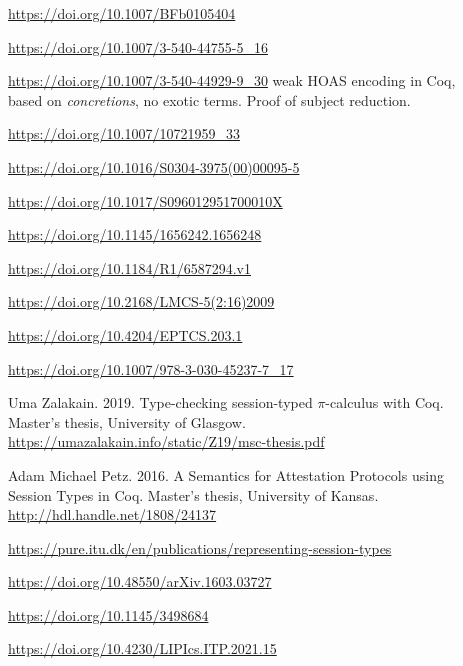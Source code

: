 \begin{description}
\item[\cite{Gordon1996}]                  \url{https://doi.org/10.1007/BFb0105404}
\item[\cite{Gay2001}]                     \url{https://doi.org/10.1007/3-540-44755-5_16}
\item[\cite{Despeyroux2000}]              \url{https://doi.org/10.1007/3-540-44929-9_30}
  weak HOAS encoding in Coq, based on \emph{concretions}, no exotic terms. Proof of subject reduction.
\item[\cite{Gillard2000}]                 \url{https://doi.org/10.1007/10721959_33}
\item[\cite{Honsell2001}]                 \url{https://doi.org/10.1016/S0304-3975(00)00095-5}
\item[\cite{Perera2018}]                  \url{https://doi.org/10.1017/S096012951700010X}
\item[\cite{Tiu2010}]                     \url{https://doi.org/10.1145/1656242.1656248}
\item[\cite{Cervesato2007}]               \url{https://doi.org/10.1184/R1/6587294.v1}
\item[\cite{Bengtson2009}]                \url{https://doi.org/10.2168/LMCS-5(2:16)2009}
\item[\cite{Orchard2016}]                 \url{https://doi.org/10.4204/EPTCS.203.1}
\item[\cite{Castro2020}]                  \url{https://doi.org/10.1007/978-3-030-45237-7_17}
\item[\cite{Zalakain2019}]                Uma Zalakain. 2019. Type-checking session-typed $\pi$-calculus with Coq. Master's thesis, University of Glasgow. \url{https://umazalakain.info/static/Z19/msc-thesis.pdf}
\item[\cite{Petz2016}]                    Adam Michael Petz. 2016. A Semantics for Attestation Protocols using Session Types in Coq. Master's thesis, University of Kansas. \url{http://hdl.handle.net/1808/24137}
\item[\cite{Bock2016}]                    \url{https://pure.itu.dk/en/publications/representing-session-types}
\item[\cite{Xi2016}]                      \url{https://doi.org/10.48550/arXiv.1603.03727}
\item[\cite{Hirsch2022}]                  \url{https://doi.org/10.1145/3498684}
\item[\cite{Cruz-Filipe2021b}]            \url{https://doi.org/10.4230/LIPIcs.ITP.2021.15}

\end{description}
